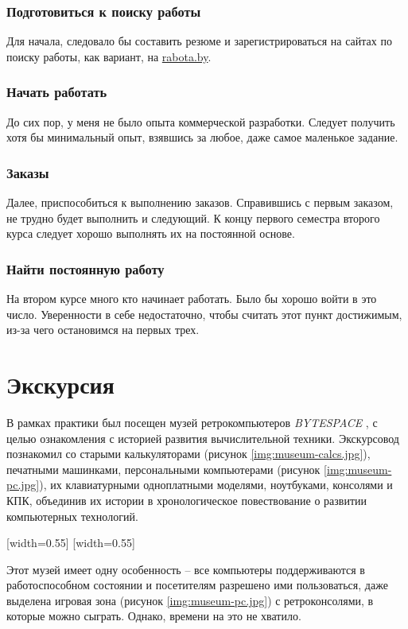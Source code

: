 \documentclass[variant=practice]{bsuir}
\begin{document}
\subsection{Подготовиться к поиску работы} Для начала, следовало бы составить
резюме и зарегистрироваться на сайтах по поиску работы, как вариант, на
\url{rabota.by}.

\subsection{Начать работать} До сих пор, у меня не было опыта коммерческой
разработки. Следует получить хотя бы минимальный опыт, взявшись за любое, даже
самое маленькое задание.

\subsection{Заказы} Далее, приспособиться к выполнению заказов.
Справившись с первым заказом, не трудно будет выполнить и следующий. К концу
первого семестра второго курса следует хорошо выполнять их на постоянной основе.

\subsection{Найти постоянную работу} На втором курсе много кто начинает
работать. Было бы хорошо войти в это число. Уверенности в себе недостаточно,
чтобы считать этот пункт достижимым, из-за чего остановимся на первых трех.

\chapter{Экскурсия}

В рамках практики был посещен музей ретрокомпьютеров \textit{BYTESPACE}
, с целью ознакомления с историей
развития вычислительной техники. Экскурсовод познакомил со старыми
калькуляторами (рисунок \ref{img:museum-calcs.jpg}), печатными машинками,
персональными компьютерами (рисунок \ref{img:museum-pc.jpg}), их клавиатурными
одноплатными моделями, ноутбуками, консолями и КПК, объединив их истории в
хронологическое повествование о развитии компьютерных технологий.

[width=0.55\textwidth]
[width=0.55\textwidth]

Этот музей имеет одну особенность -- все компьютеры поддерживаются в
работоспособном состоянии и посетителям разрешено ими пользоваться, даже
выделена игровая зона (рисунок \ref{img:museum-pc.jpg}) с ретроконсолями, в
которые можно сыграть. Однако, времени на это не хватило.
\end{document}
